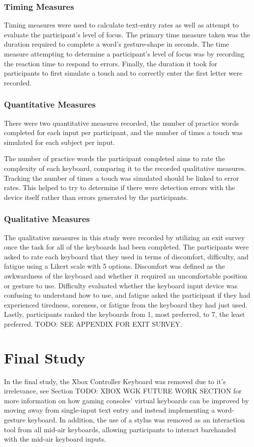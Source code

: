 \subsubsection{Timing Measures}
Timing measures were used to calculate text-entry rates as well as attempt to evaluate the participant's level of focus. The primary time measure taken was the duration required to complete a word's gesture-shape in seconds. The time measure attempting to determine a participant's level of focus was by recording the reaction time to respond to errors. Finally, the duration it took for participants to first simulate a touch and to correctly enter the first letter were recorded.

\subsubsection{Quantitative Measures}
There were two quantitative measures recorded, the number of practice words completed for each input per participant, and the number of times a touch was simulated for each subject per input.

The number of practice words the participant completed aims to rate the complexity of each keyboard, comparing it to the recorded qualitative measures. Tracking the number of times a touch was simulated should be linked to error rates. This helped to try to determine if there were detection errors with the device itself rather than errors generated by the participants.

\subsubsection{Qualitative Measures}
The qualitative measures in this study were recorded by utilizing an exit survey once the task for all of the keyboards had been completed. The participants were asked to rate each keyboard that they used in terms of discomfort, difficulty, and fatigue using a Likert scale with 5 options. Discomfort was defined as the awkwardness of the keyboard and whether it required an uncomfortable position or gesture to use. Difficulty evaluated whether the keyboard input device was confusing to understand how to use, and fatigue asked the participant if they had experienced tiredness, soreness, or fatigue from the keyboard they had just used. Lastly, participants ranked the keyboards from 1, most preferred, to 7, the least preferred. TODO: SEE APPENDIX FOR EXIT SURVEY. 

\section{Final Study} \label{final_study}
In the final study, the Xbox Controller Keyboard was removed due to it's irrelevance, see Section TODO: XBOX WGK FUTURE WORK SECTION for more information on how gaming consoles' virtual keyboards can be improved by moving away from single-input text entry and instead implementing a word-gesture keyboard. In addition, the use of a stylus was removed as an interaction tool from all mid-air keyboards, allowing participants to interact barehanded with the mid-air keyboard inputs.

